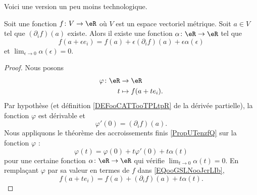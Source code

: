 Voici une version un peu moins technologique.
\begin{proposition}     \label{PROPooYYSMooUDxtlB}
	Soit une fonction \( f\colon V\to \eR\) où \( V\) est un espace vectoriel métrique. Soit \( a\in V\) tel que \( (\partial_if)(a)\) existe. Alors il existe une fonction \( \alpha\colon \eR\to \eR\) tel que
	\begin{equation}
		f(a+\epsilon e_i)=f(a)+\epsilon(\partial_if)(a)+\epsilon\alpha(\epsilon)
	\end{equation}
	et \( \lim_{\epsilon\to 0}\alpha(\epsilon)=0\).
\end{proposition}

\begin{proof}
	Nous posons
	\begin{equation}
		\begin{aligned}
			\varphi\colon \eR & \to \eR             \\
			t                 & \mapsto f(a+ te_i).
		\end{aligned}
	\end{equation}
	Par hypothèse (et définition \ref{DEFooCATTooTPLtpR} de la dérivée partielle), la fonction \( \varphi\) est dérivable et
	\begin{equation}
		\varphi'(0)=(\partial_if)(a).
	\end{equation}
	Nous appliquons le théorème des accroissements finis \ref{PropUTenzfQ} sur la fonction \( \varphi\) :
	\begin{equation}        \label{EQooGSLNooJcrLIb}
		\varphi(t)=\varphi(0)+t\varphi'(0)+t\alpha(t)
	\end{equation}
	pour une certaine fonction \( \alpha\colon \eR\to \eR\) qui vérifie \( \lim_{t\to 0} \alpha(t)=0\). En remplaçant \( \varphi\) par sa valeur en termes de \( f\) dans \eqref{EQooGSLNooJcrLIb},
	\begin{equation}
		f(a+te_i)=f(a)+(\partial_if)(a)+t\alpha(t).
	\end{equation}
\end{proof}
